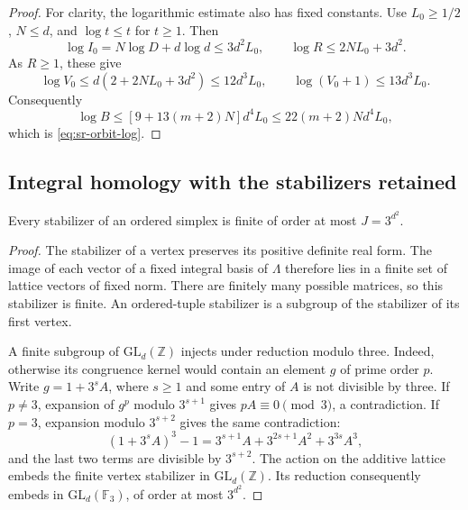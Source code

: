 \begin{proof}
For clarity, the logarithmic estimate also has fixed constants.
Use \(L_0\geq1/2\), \(N\leq d\), and
\(\log t\leq t\) for \(t\geq1\). Then
\[
 \log I_0=N\log D+d\log d\leq3d^2L_0,
 \qquad
 \log R\leq2NL_0+3d^2.
\]
As \(R\geq1\), these give
\[
 \log V_0\leq d(2+2NL_0+3d^2)\leq12d^3L_0,
 \qquad
 \log(V_0+1)\leq13d^3L_0.
\]
Consequently
\[
 \log B\leq
       [9+13(m+2)N]d^4L_0
                 \leq22(m+2)Nd^4L_0,
\]
which is \eqref{eq:sr-orbit-log}.
\end{proof}

\subsection{Integral homology with the stabilizers retained}
\begin{srlemma}\label{lem:sr-stabilizer-size}
Every stabilizer of an ordered simplex is finite of order at most
\(J=3^{d^2}\).
\end{srlemma}
\begin{proof}
The stabilizer of a vertex preserves its positive definite real form.
The image of each vector of a fixed integral basis of \(\Lambda\)
therefore lies in a finite set of lattice vectors of fixed norm.
There are finitely many possible matrices, so this stabilizer is finite.
An ordered-tuple stabilizer is a subgroup of the stabilizer of its
first vertex.

A finite subgroup of \(\mathrm{GL}_d(\mathbb Z)\) injects under
reduction modulo three. Indeed, otherwise its congruence kernel
would contain an element \(g\) of prime order \(p\).
Write \(g=1+3^sA\), where \(s\geq1\) and some entry of \(A\) is
not divisible by three.
If \(p\ne3\), expansion of \(g^p\) modulo \(3^{s+1}\) gives
\(pA\equiv0\pmod3\), a contradiction.
If \(p=3\), expansion modulo \(3^{s+2}\) gives the same contradiction:
\[
 (1+3^sA)^3-1
      =3^{s+1}A+3^{2s+1}A^2+3^{3s}A^3,
\]
and the last two terms are divisible by \(3^{s+2}\).
The action on the additive lattice embeds the finite vertex stabilizer
in \(\mathrm{GL}_d(\mathbb Z)\).
Its reduction consequently embeds in
\(\mathrm{GL}_d(\mathbb F_3)\), of order at most \(3^{d^2}\).
\end{proof}

